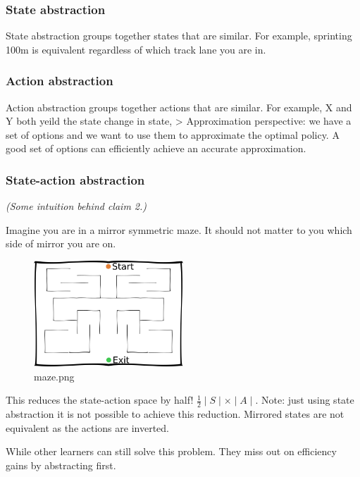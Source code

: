 \subsubsection{State abstraction}

State abstraction groups together states that are similar. For example,
sprinting 100m is equivalent regardless of which track lane you are in.

\subsubsection{Action abstraction}

Action abstraction groups together actions that are similar. For
example, X and Y both yeild the state change in state, \textgreater{}
Approximation perspective: we have a set of options and we want to use
them to approximate the optimal policy. A good set of options can
efficiently achieve an accurate approximation.

\subsubsection{State-action abstraction}

\emph{(Some intuition behind claim 2.)}

Imagine you are in a mirror symmetric maze. It should not matter to you
which side of mirror you are on.

\begin{figure}
\centering
\includegraphics[width=0.5\textwidth,height=0.5\textheight]{../../pictures/drawings/maze.png}
\caption{maze.png}
\end{figure}

This reduces the state-action space by half!
\(\frac{1}{2}\mid S \mid \times \mid A \mid\). Note: just using state
abstraction it is not possible to achieve this reduction. Mirrored
states are not equivalent as the actions are inverted.

While other learners can still solve this problem. They miss out on
efficiency gains by abstracting first.

